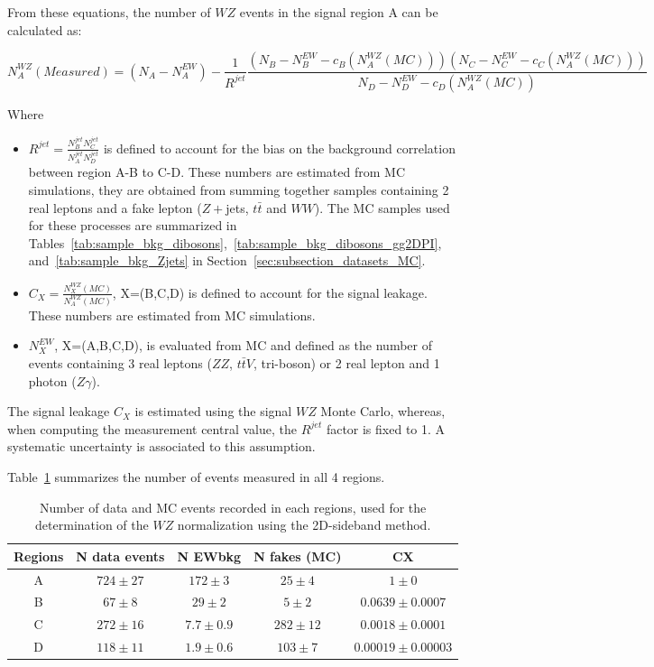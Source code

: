 From these equations, the number of $WZ$ events in the signal region A can be calculated as:

\begin{equation}
N_A^{WZ}(Measured)=(N_A-N_A^{EW})-\frac{1}{R^{jet}} \frac{(N_B-N_B^{EW}-c_B (N_A^{WZ}(MC))) (N_C-N_C^{EW}-c_C (N_A^{WZ}(MC)))}{N_D-N_D^{EW}-c_D (N_A^{WZ}(MC))}
\label{Equ:NWjet1}
\end{equation}

Where 
\begin{itemize}
\item $R^{jet}=\frac{N^{jet}_B N^{jet}_C}{N^{jet}_A
  N^{jet}_D}$ is defined to account for the bias on the background correlation between region A-B to C-D. These numbers are estimated from MC simulations, they are obtained from summing together samples containing 2 real leptons and a fake lepton ($Z+$jets, $t\bar{t}$ and $WW$). The MC samples used for these processes are summarized in Tables~\ref{tab:sample_bkg_dibosons},~\ref{tab:sample_bkg_dibosons_gg2DPI}, and~\ref{tab:sample_bkg_Zjets} in Section~\ref{sec:subsection_datasets_MC}.
\item $C_X=\frac{N_X^{WZ}(MC)}{N_A^{WZ}(MC)}$, X=(B,C,D) is defined to account for the signal leakage. These numbers are estimated from MC simulations.
\item $N_X^{EW}$, X=(A,B,C,D), is evaluated from MC and defined as the number of events containing 3 real leptons ($ZZ$, $t\bar{t}V$, tri-boson) or 2 real lepton and 1 photon ($Z\gamma$).
\end{itemize}
The signal leakage $C_X$ is estimated using the signal $WZ$ Monte Carlo, whereas, when computing the measurement central value, the $R^{jet}$ factor is fixed to 1. A systematic uncertainty is associated to this assumption. 



Table~\ref{tab:WZ_Nominal_Numbers} summarizes the number of events measured in all 4 regions.

\begin{table}[htp]
\centering
\begin{tabular}{c|cccc}
  \hline
  Regions & N data events & N EWbkg      & N fakes (MC)    & CX \\
  \hline
	    A & $724 \pm 27$ & $172 \pm 3$   & $25 \pm 4$ & $1 \pm 0$ \\ 
	    B & $67 \pm 8$   & $29 \pm  2$   & $5 \pm 2$ & $0.0639 \pm 0.0007$ \\ 
	    C & $272 \pm 16$ & $7.7 \pm 0.9$ & $282 \pm 12$ & $0.0018 \pm 0.0001$ \\ 
	    D & $118 \pm 11$ & $1.9 \pm 0.6$ & $103 \pm 7$ & $0.00019 \pm 0.00003$ \\ 
  \hline
\end{tabular}
\caption{Number of data and MC events recorded in each regions, used for the determination of the $WZ$ normalization using the 2D-sideband method.}
\label{tab:WZ_Nominal_Numbers}
\end{table}

